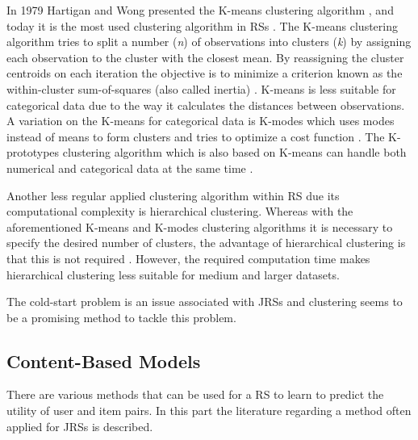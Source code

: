 In 1979 Hartigan and Wong presented the K-means clustering algorithm \cite{hartigan1979algorithm}, and today it is the most used clustering algorithm in RSs \cite{aggarwal2016recommender}.
The K-means clustering algorithm tries to split a number (\textit{n}) of observations into clusters (\textit{k}) by assigning each observation to the cluster with the closest mean.
By reassigning the cluster centroids on each iteration the objective is to minimize a criterion known as the within-cluster sum-of-squares (also called inertia) \cite{mackay2003example}. 
K-means is less suitable for categorical data due to the way it calculates the distances between observations.
A variation on the K-means for categorical data is K-modes which uses modes instead of means to form clusters and tries to optimize a cost function \cite{huang1997clustering, huang1998extensions}.
The K-prototypes clustering algorithm which is also based on K-means can handle both numerical and categorical data at the same time \cite{huang1997clustering}.

Another less regular applied clustering algorithm within RS due its computational complexity is hierarchical clustering.
Whereas with the aforementioned K-means and K-modes clustering algorithms it is necessary to specify the desired number of clusters, the advantage of hierarchical clustering is that this is not required \cite{rokach2005clustering}.
However, the required computation time makes hierarchical clustering less suitable for medium and larger datasets. 

The cold-start problem is an issue associated with JRSs and clustering seems to be a promising method to tackle this problem.

\subsection{Content-Based Models}
\label{sec:cbm}
There are various methods that can be used for a RS to learn to predict the utility of user and item pairs. 
In this part the literature regarding a method often applied for JRSs is described.

